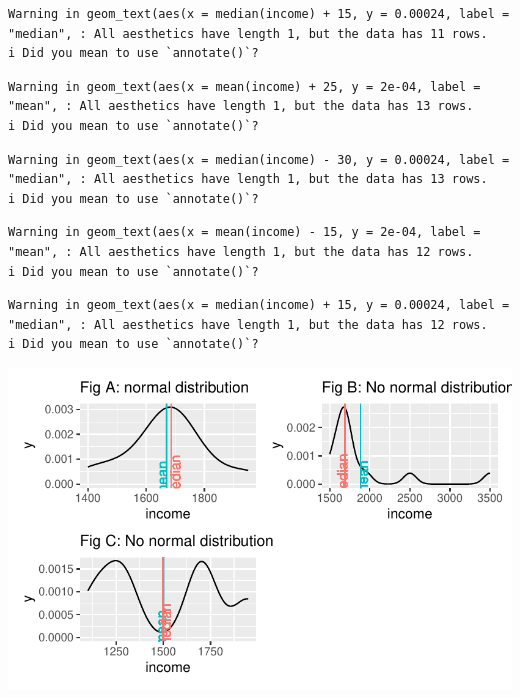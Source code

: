 \documentclass[
  letterpaper,
]{krantz}
\begin{document}
\begin{verbatim}
Warning in geom_text(aes(x = median(income) + 15, y = 0.00024, label = "median", : All aesthetics have length 1, but the data has 11 rows.
i Did you mean to use `annotate()`?
\end{verbatim}

\begin{verbatim}
Warning in geom_text(aes(x = mean(income) + 25, y = 2e-04, label = "mean", : All aesthetics have length 1, but the data has 13 rows.
i Did you mean to use `annotate()`?
\end{verbatim}

\begin{verbatim}
Warning in geom_text(aes(x = median(income) - 30, y = 0.00024, label = "median", : All aesthetics have length 1, but the data has 13 rows.
i Did you mean to use `annotate()`?
\end{verbatim}

\begin{verbatim}
Warning in geom_text(aes(x = mean(income) - 15, y = 2e-04, label = "mean", : All aesthetics have length 1, but the data has 12 rows.
i Did you mean to use `annotate()`?
\end{verbatim}

\begin{verbatim}
Warning in geom_text(aes(x = median(income) + 15, y = 0.00024, label = "median", : All aesthetics have length 1, but the data has 12 rows.
i Did you mean to use `annotate()`?
\end{verbatim}

\includegraphics{09_sources_of_bias_files/figure-pdf/comparing-distributions-plus-means-1.pdf}
\end{document}
